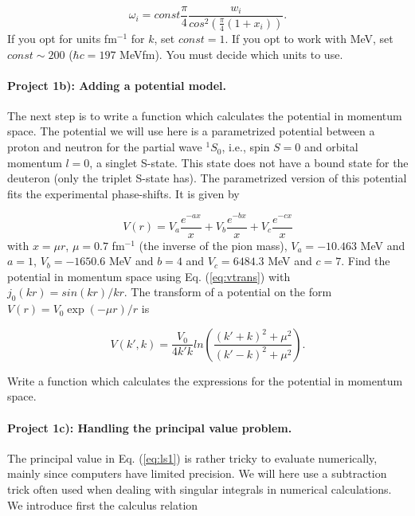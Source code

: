 \documentclass[%
oneside,                 %
final,                   %
10pt]{article}
\begin{document}
\begin{equation*}
            \omega_i= const\frac{\pi}{4}\frac{w_i}{cos^2\left(\frac{\pi}{4}(1+x_i)\right)}.
         \end{equation*}
If you opt for units fm$^{-1}$ for $k$, set $const=1$. If you opt to work
with MeV, set $const\sim 200$ ($\hbar c=197$ MeVfm).
You must decide which units to use.

\paragraph{Project 1b): Adding a potential model.}
The next step is to write a function which calculates the potential
in momentum space. The potential we will use here is a parametrized  potential
between a proton and neutron for the partial wave  $^1S_{0}$, 
i.e., spin $S=0$ and
orbital momentum $l=0$, a singlet S-state. 
This state does not have a bound state
for the deuteron (only the triplet S-state has). 
The parametrized version of this potential fits the experimental
phase-shifts. It is given by

\begin{equation}
  V(r)=V_a \frac{e^{-ax}}{x}+V_b \frac{e^{-bx}}{x}+V_c \frac{e^{-cx}}{x}
  \label{eq:realp}
\end{equation}
with $x=\mu r$, $\mu=0.7$ fm$^{-1}$ (the inverse of the pion mass),
$V_a=-10.463$ MeV and $a=1$, $V_b=-1650.6$ MeV and $b=4$ and
$V_c=6484.3$ MeV and $c=7$. 
Find the potential in momentum space using Eq. (\ref{eq:vtrans})
with $j_0(kr)=sin(kr)/kr$. 
The transform of a potential on the form 
$V(r)=V_0\exp{(-\mu r)}/r$ is

\begin{equation}
     V(k',k)= \frac{V_0}{4k'k}ln\left(\frac{(k'+k)^2+\mu^2}{(k'-k)^2+\mu^2}\right).
\end{equation}

Write a function which calculates the expressions for the
potential in momentum space.

\paragraph{Project 1c): Handling the principal value problem.}
The principal value in Eq. (\ref{eq:ls1}) is rather tricky
to evaluate numerically, mainly since computers have limited
precision. We will here use a subtraction trick often used
when dealing with singular integrals in numerical calculations.
We introduce first the calculus relation
\end{document}
